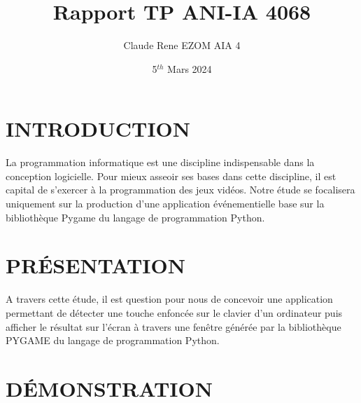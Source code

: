 \documentclass[12pt]{article}\usepackage{indentfirst}\usepackage[margin=2cm]{geometry}
\begin{document}
	\title{\Huge{Rapport TP ANI-IA 4068}}\author{Claude Rene EZOM AIA 4}\date{5$^{th}$ Mars 2024}\maketitle\tableofcontents\newpage
	\section{INTRODUCTION}
	La programmation informatique est une discipline indispensable dans la
  conception logicielle. Pour mieux asseoir ses bases dans cette discipline, il est capital de s'exercer à la programmation des jeux vidéos. Notre étude se focalisera uniquement sur la production 
  d'une application événementielle base sur la bibliothèque Pygame du langage de programmation Python.
  \section{PRÉSENTATION}
	 A travers cette étude, il est question pour nous de concevoir
  une application permettant de détecter une touche enfoncée sur le clavier d'un ordinateur puis afficher le résultat sur l'écran à travers une fenêtre générée par la bibliothèque PYGAME du langage de programmation Python.

 \section{DÉMONSTRATION}
\end{document}
